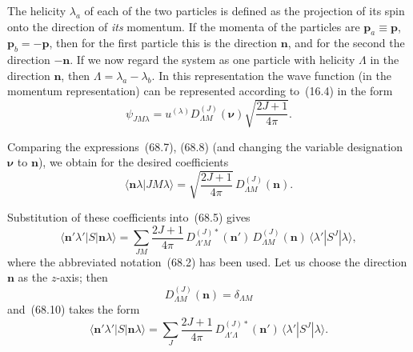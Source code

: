 The helicity $\lambda_a$ of each of the two particles is defined as the projection of its spin onto the direction of \textit{its} momentum. If the momenta of the particles are $\mathbf{p}_a \equiv \mathbf{p}$, $\mathbf{p}_b = -\mathbf{p}$, then for the first particle this is the direction $\mathbf{n}$, and for the second the direction $-\mathbf{n}$. If we now regard the system as one particle with helicity $\Lambda$ in the direction $\mathbf{n}$, then $\Lambda = \lambda_a - \lambda_b$. In this representation the wave function (in the momentum representation) can be represented according to~(16.4) in the form
\begin{equation}
\psi_{JM\lambda} = u^{(\lambda)} D^{(J)}_{\Lambda M}(\boldsymbol{\nu})\sqrt{\frac{2J+1}{4\pi}}.
\tag{68.8}
\end{equation}

Comparing the expressions~(68.7), (68.8) (and changing the variable designation $\boldsymbol{\nu}$ to $\mathbf{n}$), we obtain for the desired coefficients
\begin{equation}
\langle\mathbf{n}\lambda|JM\lambda\rangle = \sqrt{\frac{2J+1}{4\pi}}\,D^{(J)}_{\Lambda M}(\mathbf{n}).
\tag{68.9}
\end{equation}

Substitution of these coefficients into~(68.5) gives
\begin{equation}
\langle\mathbf{n}'\lambda'|S|\mathbf{n}\lambda\rangle = \sum_{JM}\frac{2J+1}{4\pi}\,D^{(J)*}_{\Lambda'M}(\mathbf{n}')\,D^{(J)}_{\Lambda M}(\mathbf{n})\,\langle\lambda'|S^J|\lambda\rangle,
\tag{68.10}
\end{equation}
where the abbreviated notation~(68.2) has been used. Let us choose the direction $\mathbf{n}$ as the $z$-axis; then
\[
D^{(J)}_{\Lambda M}(\mathbf{n}) = \delta_{\Lambda M}
\]
and~(68.10) takes the form
\begin{equation}
\langle\mathbf{n}'\lambda'|S|\mathbf{n}\lambda\rangle = \sum_J\frac{2J+1}{4\pi}\,D^{(J)*}_{\Lambda'\Lambda}(\mathbf{n}')\,\langle\lambda'|S^J|\lambda\rangle.
\tag{68.11}
\end{equation}

